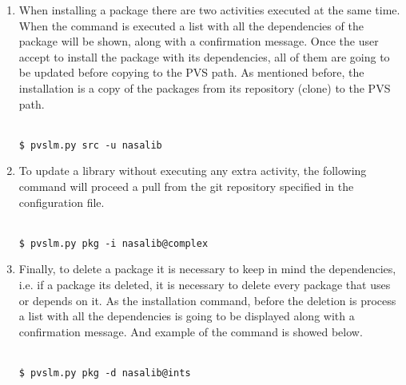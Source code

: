 \begin{enumerate}
\item
  When installing a package there are two activities executed at the same time. When the command is executed a list with all the dependencies of the package will be shown, along with a confirmation message. Once the user accept to install the package with its dependencies, all of them are going to be updated before copying to the PVS path. As mentioned before, the installation is a copy of the packages from its repository (clone) to the PVS path.
  
  \texttt {\\\$ pvslm.py src -u nasalib\\}

\item
  To update a library without executing any extra activity, the following command will proceed a pull from the git repository specified in the configuration file.  

  \texttt {\\\$ pvslm.py pkg -i nasalib@complex\\}

\item 
  Finally, to delete a package it is necessary to keep in mind the dependencies, i.e. if a package its deleted, it is necessary to delete every package that uses or depends on it. As the installation command, before the deletion is process a list with all the dependencies is going to be displayed along with a confirmation message. And example of the command is showed below.   

  \texttt {\\\$ pvslm.py pkg -d nasalib@ints\\}

\end{enumerate}
